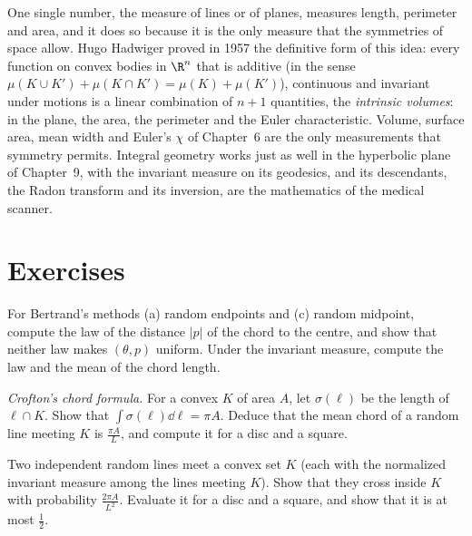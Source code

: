\begin{beauty}
One single number, the measure of lines or of planes, measures length, perimeter and area, and it does so because it is the only measure that the symmetries of space allow. Hugo Hadwiger
proved in 1957 the definitive form of this idea: every function on convex bodies in $\R^n$ that is additive (in the sense $\mu(K\cup K')+\mu(K\cap K')=\mu(K)+\mu(K')$), continuous and invariant under
motions is a linear combination of $n+1$ quantities, the \emph{intrinsic volumes}: in the plane, the area, the perimeter and the Euler characteristic. Volume, surface area, mean width and
Euler's $\chi$ of Chapter~6 are the only measurements that symmetry permits. Integral geometry works just as well in the hyperbolic plane of Chapter~9, with the invariant measure on its geodesics,
and its descendants, the Radon transform and its inversion, are the mathematics of the medical scanner.
\end{beauty}

\section{Exercises}

\begin{exercise}[$\star$]\label{ex:bertrandlaws}
For Bertrand's methods (a) random endpoints and (c) random midpoint, compute the law of the distance $|p|$ of the chord to the centre, and show that neither law makes $(\theta,p)$ uniform. Under the
invariant measure, compute the law and the mean of the chord length.
\end{exercise}

\begin{exercise}[$\star$]\label{ex:chord}
\emph{Crofton's chord formula.} For a convex $K$ of area $A$, let $\sigma(\ell)$ be the length of $\ell\cap K$. Show that $\int\sigma(\ell)\dd\ell=\pi A$. Deduce that the mean chord of a random line meeting $K$ is
$\frac{\pi A}{L}$, and compute it for a disc and a square.
\end{exercise}

\begin{exercise}[$\star\star$]\label{ex:twolines}
Two independent random lines meet a convex set $K$ (each with the normalized invariant measure among the lines meeting $K$). Show that they cross inside $K$ with probability $\frac{2\pi A}{L^2}$. Evaluate
it for a disc and a square, and show that it is at most $\frac12$.
\end{exercise}

